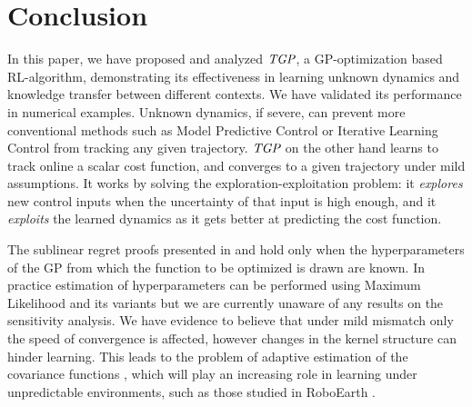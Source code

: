 \section{Conclusion}\label{sec:conclusion}
In this paper, we have proposed and analyzed $\emph{TGP}$, a GP-optimization based RL-algorithm, demonstrating its effectiveness in learning unknown dynamics and knowledge transfer between different contexts. We have validated its performance in numerical examples. Unknown dynamics, if severe, can prevent more conventional methods such as Model Predictive Control or Iterative Learning Control from tracking any given trajectory. $\emph{TGP}$ on the other hand learns to track online a scalar cost function, and converges to a given trajectory under mild assumptions. It works by solving the exploration-exploitation problem: it \emph{explores} new control inputs when the uncertainty of that input is high enough, and it \emph{exploits} the learned dynamics as it gets better at predicting the cost function.

The sublinear regret proofs presented in \citet{Srinivas09} and \citet{Krause11} hold only when the hyperparameters of the GP from which the function to be optimized is drawn are known. In practice estimation of hyperparameters can be performed using Maximum Likelihood and its variants but we are currently unaware of any results on the sensitivity analysis. We have evidence to believe that under mild mismatch only the speed of convergence is affected, however changes in the kernel structure can hinder learning. This leads to the problem of adaptive estimation of the covariance functions \cite{Ginsbourger08}, which will play an increasing role in learning under unpredictable environments, such as those studied in RoboEarth \cite{Waibel11}.


%
